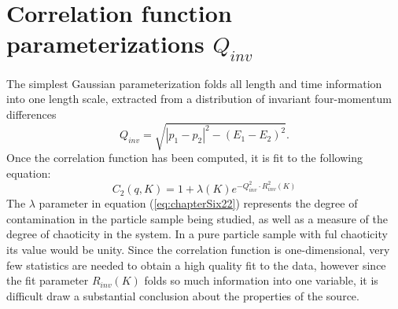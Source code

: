 \section{Correlation function parameterizations $Q_{inv}$}
The simplest Gaussian parameterization folds all length and time information into one length scale,%
extracted from a distribution of invariant four-momentum differences
\begin{equation}
  \label{eq:chapterSix21}
  Q_{inv} = \sqrt{|p_{1}-p_{2}|^{2} - (E_{1}-E_{2})^{2}}.
\end{equation}
Once the correlation function has been computed,%
it is fit to the following equation:
\begin{equation}
  \label{eq:chapterSix22}
  C_{2}(q, K) = 1 + \lambda(K)e^{-Q_{inv}^{2}\cdot R_{inv}^{2}(K)}
\end{equation}
The $\lambda$ parameter in equation (\ref{eq:chapterSix22}) represents the degree of contamination in the particle sample being studied,%
as well as a measure of the degree of chaoticity in the system.%
In a pure particle sample with ful chaoticity its value would be unity.%
Since the correlation function is one-dimensional, very few statistics are needed to obtain a high quality fit to the data,%
however since the fit parameter $R_{inv}(K)$ folds so much information into one variable,%
it is difficult draw a substantial conclusion about the properties of the source.

